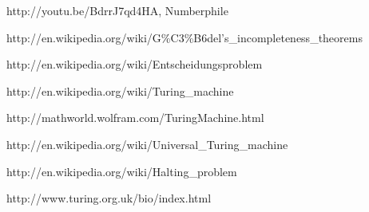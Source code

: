 \documentclass[12pt]{article}
\theoremstyle{mystyle}
\begin{document}
\begin{thebibliography}{9}

http://youtu.be/BdrrJ7qd4HA,
Numberphile

\bibitem{}
http://en.wikipedia.org/wiki/G\%C3\%B6del's\_incompleteness\_theorems

\bibitem{}
http://en.wikipedia.org/wiki/Entscheidungsproblem

\bibitem{}
http://en.wikipedia.org/wiki/Turing\_machine

\bibitem{}
http://mathworld.wolfram.com/TuringMachine.html

\bibitem{}
http://en.wikipedia.org/wiki/Universal\_Turing\_machine

\bibitem{}
http://en.wikipedia.org/wiki/Halting\_problem

\bibitem{}
http://www.turing.org.uk/bio/index.html

\end{thebibliography}
\end{document}
